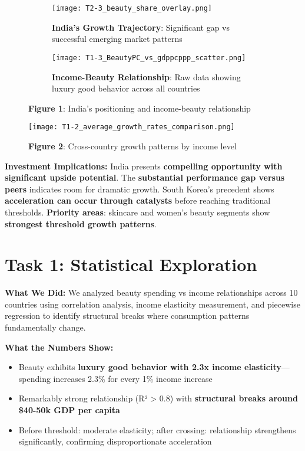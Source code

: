 \documentclass[11pt]{article}
\begin{document}
\begin{figure}[H]
\centering
\begin{subfigure}[b]{0.48\textwidth}
    \texttt{[image: T2-3\_beauty\_share\_overlay.png]}
    \caption{\textbf{India's Growth Trajectory}: Significant gap vs successful emerging market patterns}
\end{subfigure}
\hfill
\begin{subfigure}[b]{0.48\textwidth}
    \texttt{[image: T1-3\_BeautyPC\_vs\_gdppcppp\_scatter.png]}
    \caption{\textbf{Income-Beauty Relationship}: Raw data showing luxury good behavior across all countries}
\end{subfigure}
\caption{\textbf{Figure 1}: India's positioning and income-beauty relationship}
\end{figure}

\begin{figure}[H]
\centering
\texttt{[image: T1-2\_average\_growth\_rates\_comparison.png]}
\caption{\textbf{Figure 2}: Cross-country growth patterns by income level}
\end{figure}

\textbf{Investment Implications:} India presents \textbf{compelling opportunity with significant upside potential}. The \textbf{substantial performance gap versus peers} indicates room for dramatic growth. South Korea's precedent shows \textbf{acceleration can occur through catalysts} before reaching traditional thresholds. \textbf{Priority areas}: skincare and women's beauty segments show \textbf{strongest threshold growth patterns}.

\section{Task 1: Statistical Exploration}

\textbf{What We Did:} We analyzed beauty spending vs income relationships across 10 countries using correlation analysis, income elasticity measurement, and piecewise regression to identify structural breaks where consumption patterns fundamentally change.

\textbf{What the Numbers Show:}
\vspace{-3pt}
\begin{itemize}
    \setlength{\itemsep}{1pt}
    \item Beauty exhibits \textbf{luxury good behavior with 2.3x income elasticity}—spending increases 2.3\% for every 1\% income increase
    \item Remarkably strong relationship (R² > 0.8) with \textbf{structural breaks around \$40-50k GDP per capita}
    \item Before threshold: moderate elasticity; after crossing: relationship strengthens significantly, confirming disproportionate acceleration
\end{itemize}
\end{document}
